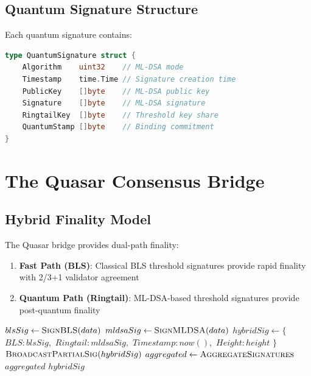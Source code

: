 \documentclass[11pt,a4paper]{article}
\begin{document}
\subsection{Quantum Signature Structure}

Each quantum signature contains:

\begin{lstlisting}[language=Go,caption={Quantum Signature}]
type QuantumSignature struct {
    Algorithm    uint32    // ML-DSA mode
    Timestamp    time.Time // Signature creation time
    PublicKey    []byte    // ML-DSA public key
    Signature    []byte    // ML-DSA signature
    RingtailKey  []byte    // Threshold key share
    QuantumStamp []byte    // Binding commitment
}
\end{lstlisting}

\section{The Quasar Consensus Bridge}

\subsection{Hybrid Finality Model}

The Quasar bridge provides dual-path finality:

\begin{enumerate}
    \item \textbf{Fast Path (BLS)}: Classical BLS threshold signatures provide rapid finality with 2/3+1 validator agreement
    \item \textbf{Quantum Path (Ringtail)}: ML-DSA-based threshold signatures provide post-quantum finality
\end{enumerate}

\begin{algorithm}
\caption{Quasar Hybrid Block Signing}
\begin{algorithmic}[1]
    \State $blsSig \gets \Call{SignBLS}{data}$
    \State $mldsaSig \gets \Call{SignMLDSA}{data}$
    \State $hybridSig \gets \{$
    \State \quad $BLS: blsSig,$
    \State \quad $Ringtail: mldsaSig,$
    \State \quad $Timestamp: now(),$
    \State \quad $Height: height$
    \State $\}$
    \State $\Call{BroadcastPartialSig}{hybridSig}$
        \State $aggregated \gets \Call{AggregateSignatures}{}$
        \State \Return $aggregated$
    \EndIf
    \State \Return $hybridSig$
\EndProcedure
\end{algorithmic}
\end{algorithm}
\end{document}
